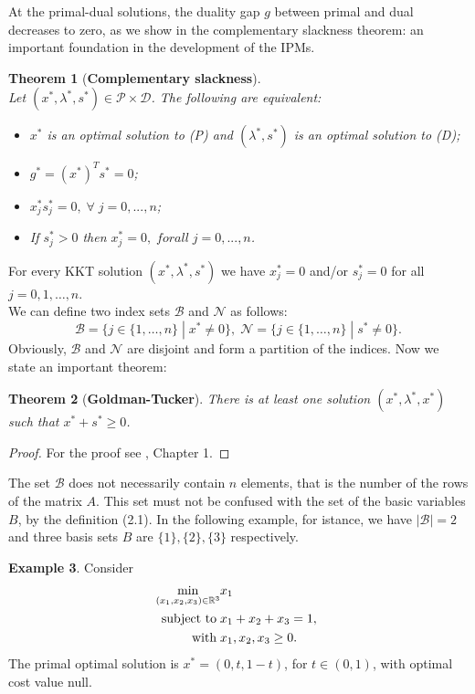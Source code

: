 \documentclass[a4paper,10 pt,titlepage,twoside]{book}
\theoremstyle{plain}
\newtheorem{thm}{Theorem}[chapter]
\theoremstyle{definition}
\newtheorem{ex}[thm]{Example}
\theoremstyle{remark}
\begin{document}
At the primal-dual solutions, the duality gap $g$ between primal and dual decreases to zero, as we show in the complementary slackness theorem: an important foundation in the development of the IPMs.
\newpage
\begin{thm}[\textbf{Complementary slackness}] \ \\
	Let $(x^{*},\lambda^{*},s^{*})\in\mathcal{P}\times\mathcal{D}$. The following are equivalent:
	\begin{itemize}
		\item $x^{*}$ is an optimal solution to (P) and $(\lambda^{*},s^{*})$ is an optimal solution to (D);
		\item $g^{*} = (x^{*})^{T}s^{*}=0$;
		\item $x^{*}_{j}s^{*}_{j}=0,\;\forall\; j=0,...,n$;
		\item If $s^{*}_{j} > 0$ then $x^{*}_{j}= 0,\;for all\; j=0,...,n$.
	\end{itemize}
\end{thm}

For every KKT solution $(x^{*}, \lambda^{*}, s^{*})$ we have $x_{j}^{*}= 0$ and/or $s_{j}^{*}= 0$ for all $j=0,1,\dots,n$.\\
We can define two index sets $\mathcal{B}$ and $\mathcal{N}$ as follows:
\begin{equation}\label{index}\tag{2.9}
\mathcal{B} =\{j\in\{1,\dots,n\}\;|\; x^{*} \not= 0\}, \;
\mathcal{N} =\{j\in\{1,\dots,n\}\;|\; s^{*} \not= 0\}.
\end{equation}  
Obviously, $\mathcal{B}$ and $\mathcal{N}$ are disjoint and form a partition of the indices. Now we state an important theorem:
\begin{thm}[\textbf{Goldman-Tucker}]
	There is at least one solution $(x^{*}, \lambda^{*}, x^{*})$ such that $x^{*}+s^{*}\geq0$.
\end{thm}
\begin{proof}
	For the proof see \cite{Wright}, Chapter 1.
\end{proof}
The set $\mathcal{B}$ does not necessarily contain $n$ elements, that is the number of the rows of the matrix $A$. This set must not be confused with the set of the basic variables $B$, by the definition (2.1). In the following example, for istance, we have $|\mathcal{B}|= 2$ and three basis sets $B$ are $\{1\}, \{2\}, \{3\}$ respectively.
\begin{ex}
Consider
\begin{align*} \min\limits_{(x_{1},x_{2},x_{3})\in\mathbb{R}^{3}} &x_{1}\\ \text{\;subject to\;} &x_{1}+x_{2}+x_{3} = 1,\; \\
 \text{\; with\;} &x_{1}, x_{2}, x_{3} \geq 0.
 \end{align*}
The primal optimal solution is $x^{*}=(0, t, 1-t)$, for $t\in(0,1)$, with optimal cost value null. 	
\end{ex} 
\end{document}
